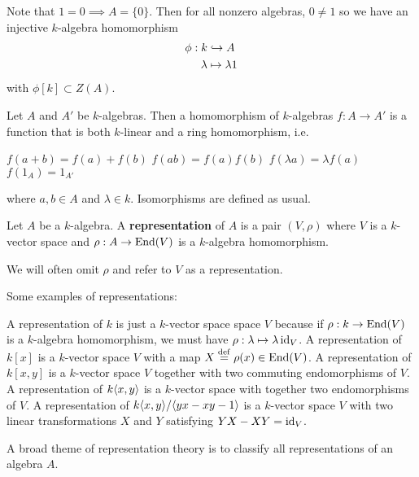 \begin{rmk}
	Note that $1=0 \implies A=\{0\}$.
	Then for all nonzero algebras, $0 \neq 1$ so we have an injective $k$-algebra homomorphism
	\begin{align*}
		\phi:k&\hookrightarrow A \\
		\lambda&\mapsto\lambda 1
	\end{align*}
	with $\phi[k] \subset Z(A)$.	
\end{rmk}

\begin{defn}
	Let $A$ and $A'$ be $k$-algebras.
	Then a homomorphism of $k$-algebras $f:A \to A'$ is a function that is both $k$-linear and a ring homomorphism, i.e.\@
	\begin{itm}
		\io $f(a+b)=f(a)+f(b)$
		\io $f(ab)=f(a)f(b)$
		\io $f(\lambda a)=\lambda f(a)$
		\io $f(1_A)=1_{A'}$
	\end{itm}
	where $a,b \in A$ and $\lambda \in k$.
	Isomorphisms are defined as usual.
\end{defn}

\begin{defn}
	Let $A$ be a $k$-algebra.
	A \textbf{representation} of $A$ is a pair $(V,\rho)$ where $V$ is a $k$-vector space and $\rho:A \to \operatorname{End}(V)$ is a $k$-algebra homomorphism.
\end{defn}

\begin{rmk}
	We will often omit $\rho$ and refer to $V$ as a representation.
\end{rmk}

\begin{exam}
	Some examples of representations:
	\begin{enum}
		\io A representation of $k$ is just a $k$-vector space space $V$ because if $\rho:k\to \operatorname{End}(V)$ is a $k$-algebra homomorphism, we must have $\rho:\lambda\mapsto \lambda\operatorname{id}_V$.
		\io A representation of $k[x]$ is a $k$-vector space $V$ with a map $X\overset{\mathrm{def}}{=}\rho(x)\in\operatorname{End}(V)$.
		\io A representation of $k[x,y]$ is a $k$-vector space $V$ together with two commuting endomorphisms of $V$.
		\io A representation of $k{\left\langle x,y \right\rangle}$ is a $k$-vector space with together two endomorphisms of $V$.
		\io A representation of $k{\left\langle x,y \right\rangle}/{\left\langle yx-xy-1 \right\rangle}$ is a $k$-vector space $V$ with two linear transformations $X$ and $Y$ satisfying $YX-XY=\operatorname{id}_V$.
	\end{enum}
\end{exam}

A broad theme of representation theory is to classify all representations of an algebra $A$.
